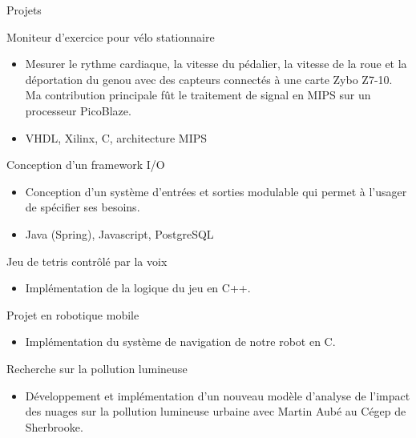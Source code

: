 \documentclass{article}
\newlength{\tabin}
\newlength{\secsep}
\newcommand{\lineunder}{\vspace*{-8pt} \\ \hspace*{-6pt} \hrulefill \\ \vspace*{-15pt}}
\newenvironment{tabbedsection}[1]{
  \begin{list}{}{
      \setlength{\itemsep}{0pt}
      \setlength{\labelsep}{0pt}
      \setlength{\labelwidth}{0pt}
      \setlength{\leftmargin}{\tabin}
      \setlength{\rightmargin}{\tabin}
      \setlength{\listparindent}{0pt}
      \setlength{\parsep}{0pt}
      \setlength{\parskip}{0pt}
      \setlength{\partopsep}{0pt}
      \setlength{\topsep}{#1}
    }
  \item[]
}{\end{list}}
\newenvironment{resume_section}[1]{
  \filbreak
  \vspace{2\secsep}
  \textsc{\large#1}
  \lineunder
  \begin{tabbedsection}{\secsep}
}{\end{tabbedsection}}
\newenvironment{resume_subsection}[2][]{
  \textbf{#2} \hfill {\footnotesize #1} \hspace{2em}
  \begin{tabbedsection}{0.5\secsep}
}{\end{tabbedsection}}
\newenvironment{subitems}{
  \renewcommand{\labelitemi}{-}
  \begin{itemize}
      \setlength{\labelsep}{1em}
}{\end{itemize}}
\begin{document}
\begin{resume_section}{Projets}
  \begin{resume_subsection}[Hiver 2019]{Moniteur d'exercice pour vélo stationnaire}
  \begin{subitems}
    \item Mesurer le rythme cardiaque, la vitesse du pédalier, la vitesse de la roue et la déportation du genou avec des capteurs connectés à une carte Zybo Z7-10. Ma contribution principale fût le traitement de signal en MIPS sur un processeur PicoBlaze.
    \item VHDL, Xilinx, C, architecture MIPS
    \end{subitems}
  \end{resume_subsection}

  \begin{resume_subsection}[Été 2018]{Conception d'un framework I/O}
  \begin{subitems}
    \item Conception d’un système d’entrées et sorties modulable qui permet à l’usager de spécifier ses besoins.
    \item Java (Spring), Javascript, PostgreSQL
    \end{subitems}
  \end{resume_subsection}

  \begin{resume_subsection}[Hiver 2018]{Jeu de tetris contrôlé par la voix}
    \begin{subitems}
        \item Implémentation de la logique du jeu en C++.
    \end{subitems}
  \end{resume_subsection}
  
  \begin{resume_subsection}[Automne 2017]{Projet en robotique mobile}
    \begin{subitems}
    \item Implémentation du système de navigation de notre robot en C.
    \end{subitems}
  \end{resume_subsection}
  
    \begin{resume_subsection}[2014-2015]{Recherche sur la pollution lumineuse}
        \begin{subitems}
        \item Développement et implémentation d'un nouveau modèle d'analyse de l'impact des nuages sur la pollution lumineuse urbaine avec Martin Aubé au Cégep de Sherbrooke.
        \end{subitems}
    \end{resume_subsection}
\end{resume_section}
\end{document}
